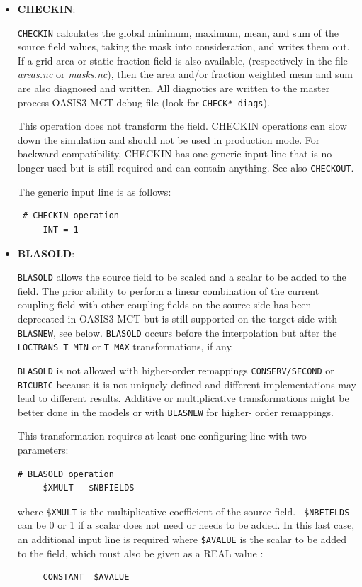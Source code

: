 \begin{itemize}

\item {\bf CHECKIN}:

  {\tt CHECKIN} calculates the global minimum, maximum, mean, and 
  sum of the source field values, taking the mask into consideration, and writes them out.
If a grid area or static fraction field is also available, (respectively in the file {\it
    areas.nc} or {\it masks.nc}), then the area and/or fraction weighted
  mean and sum are also diagnosed and written.  
All diagnotics are written to the master
  process OASIS3-MCT debug file (look for {\tt CHECK* diags}).

  This operation does not transform the field. CHECKIN operations can
  slow down the simulation and should not be used in
  production mode.  For backward compatibility, CHECKIN has one generic
  input line that is no longer used but is still required and can contain anything.
  See also {\tt CHECKOUT}.

  The generic input line is as follows:
 \begin{verbatim}
 # CHECKIN operation
     INT = 1  
\end{verbatim} 

\item {\bf BLASOLD}:

  {\tt BLASOLD} allows the source field to be scaled and a
  scalar to be added to the field.  The prior ability to perform a
  linear combination of the current coupling field with other coupling
  fields on the source side has been deprecated in OASIS3-MCT but is still supported on the target side with {\tt BLASNEW}, see below.  {\tt BLASOLD} occurs before the interpolation but after the {\tt LOCTRANS T\_MIN} or {\tt T\_MAX} transformations, if any.
  
  {\tt BLASOLD} is not allowed with higher-order remappings {\tt CONSERV/SECOND} or {\tt BICUBIC} because it is not uniquely defined and different implementations may lead to different results. Additive or multiplicative transformations might be better done in the models or with {\tt BLASNEW} for higher- order remappings.

  This transformation requires at least one configuring line with two
  parameters:
 \begin{verbatim}
# BLASOLD operation
     $XMULT   $NBFIELDS 
\end{verbatim}
  where {\tt \$XMULT} is the multiplicative coefficient of the source
  field. {\tt
    \$NBFIELDS} can be 0 or 1 if a scalar does not need or needs to be added.
  In this last case, an additional input
  line is required where {\tt \$AVALUE} is the scalar to be added to
  the field, which must also be given as a REAL value :
\begin{verbatim}
     CONSTANT  $AVALUE
\end{verbatim} 
\end{itemize}


